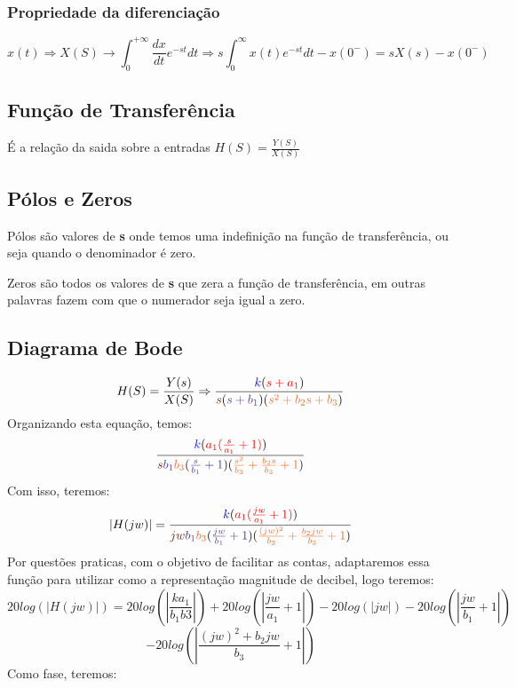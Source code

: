 \documentclass[a4paper, 12pt]{article}
\begin{document}
			\subsubsection{Propriedade da diferenciação}\label{derivada}
			\[
			x(t) \Rightarrow X(S) \rightarrow \int_{0}^{+\infty} \frac{dx}{dt}e^{-st}dt \Rightarrow s\int_{0}^{\infty} x(t)e^{-st}dt - x(0^{-}) = sX(s) - x(0^{-})
			\]
		\subsection{Função de Transferência}
		É a relação da saida sobre a entradas $H(S) = \frac{Y(S)}{X(S)}$
		\subsection{Pólos e Zeros}\label{zero}
		Pólos são valores de \textbf{s} onde temos uma indefinição na função de transferência, ou seja quando o denominador é zero.


		Zeros são todos os valores de \textbf{s} que zera a função de transferência, em outras palavras fazem com que o numerador seja igual a zero.
		\subsection{Diagrama de Bode}\label{bode}
		\[
		H(S) = \frac{Y(s)}{X(S)} \Rightarrow \frac{\textcolor{blue}{k}(\textcolor{red}{s+a_{1}})}{\textcolor{Brown}{s}(\textcolor{Violet}{s+b_{1}})(\textcolor{Orange}{s^{2}+b_{2}s+b_{3}})}
		\]
		Organizando esta equação, temos:
		\[
		 \frac{\textcolor{blue}{k}(\textcolor{red}{a_{1}(\frac{s}{a_{1}}+1)})}{\textcolor{Brown}{s}\textcolor{Violet}{b_{1}}\textcolor{Orange}{b_{3}}(\textcolor{Violet}{\frac{s}{b_{1}}+1})(\textcolor{Orange}{\frac{s^{2}}{b_{3}}+\frac{b_{2}s}{b_{3}}+1})}
		\]
		Com isso, teremos:
		\[
		|H(jw)| = 		 \frac{\textcolor{blue}{k}(\textcolor{red}{a_{1}(\frac{jw}{a_{1}}+1)})}{\textcolor{Brown}{jw}\textcolor{Violet}{b_{1}}\textcolor{Orange}{b_{3}}(\textcolor{Violet}{\frac{jw}{b_{1}}+1})(\textcolor{Orange}{\frac{(jw)^{2}}{b_{3}}+\frac{b_{2}jw}{b_{3}}+1})}
		\]
		Por questões praticas, com o objetivo de facilitar as contas, adaptaremos essa função para utilizar como a representação magnitude de decibel, logo teremos:\\

		\[20log(|H(jw)|) = 20log(|\frac{ka_{1}}{b_{1}b{3}}|) + 20log(|\frac{jw}{a_{1}}+1|) - 20log(|jw|) -20log(|\frac{jw}{b_{1}}+1|)
		\]
		\[
		- 20log(|\frac{(jw)^{2} + b_{2}jw}{b_{3}}+1|)
		\]
		Como fase, teremos:
\end{document}
